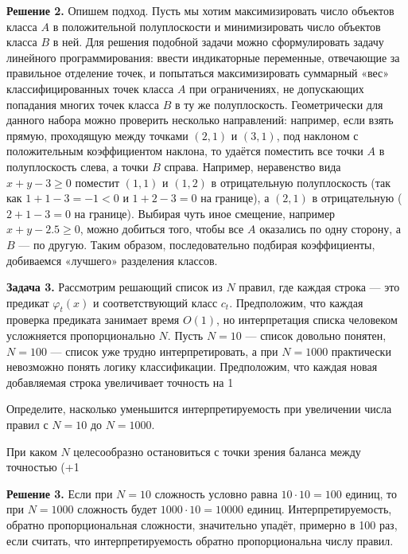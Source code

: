 \textbf{Решение 2.}
Опишем подход. Пусть мы хотим максимизировать число объектов класса $A$ в положительной полуплоскости и минимизировать число объектов класса $B$ в ней. Для решения подобной задачи можно сформулировать задачу линейного программирования: ввести индикаторные переменные, отвечающие за правильное отделение точек, и попытаться максимизировать суммарный «вес» классифицированных точек класса $A$ при ограничениях, не допускающих попадания многих точек класса $B$ в ту же полуплоскость. Геометрически для данного набора можно проверить несколько направлений: например, если взять прямую, проходящую между точками $(2,1)$ и $(3,1)$, под наклоном с положительным коэффициентом наклона, то удаётся поместить все точки $A$ в полуплоскость слева, а точки $B$ справа. Например, неравенство вида $x + y - 3 \geq 0$ поместит $(1,1)$ и $(1,2)$ в отрицательную полуплоскость (так как $1+1-3=-1<0$ и $1+2-3=0$ на границе), а $(2,1)$ в отрицательную ($2+1-3=0$ на границе). Выбирая чуть иное смещение, например $x + y - 2.5 \geq 0$, можно добиться того, чтобы все $A$ оказались по одну сторону, а $B$ — по другую. Таким образом, последовательно подбирая коэффициенты, добиваемся «лучшего» разделения классов.

\medskip

\textbf{Задача 3.} Рассмотрим решающий список из $N$ правил, где каждая строка — это предикат $\varphi_t(x)$ и соответствующий класс $c_t$. Предположим, что каждая проверка предиката занимает время $O(1)$, но интерпретация списка человеком усложняется пропорционально $N$. Пусть $N = 10$ — список довольно понятен, $N = 100$ — список уже трудно интерпретировать, а при $N = 1000$ практически невозможно понять логику классификации. Предположим, что каждая новая добавляемая строка увеличивает точность на 1%

    Определите, насколько уменьшится интерпретируемость при увеличении числа правил с $N = 10$ до $N = 1000$.

    При каком $N$ целесообразно остановиться с точки зрения баланса между точностью (+1%

\textbf{Решение 3.}
Если при $N=10$ сложность условно равна $10 \cdot 10 = 100$ единиц, то при $N=1000$ сложность будет $1000 \cdot 10 = 10000$ единиц. Интерпретируемость, обратно пропорциональная сложности, значительно упадёт, примерно в 100 раз, если считать, что интерпретируемость обратно пропорциональна числу правил.

